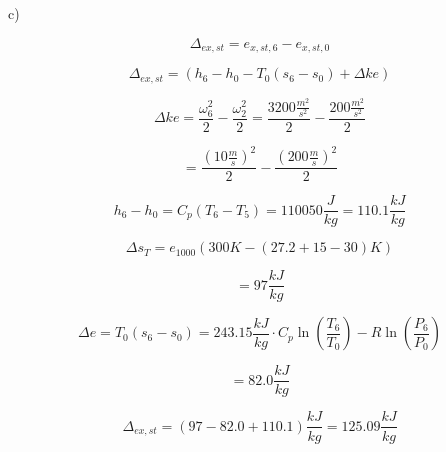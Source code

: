 c) 

\[
\Delta_{ex,st} = e_{x,st,6} - e_{x,st,0}
\]

\[
\Delta_{ex,st} = (h_6 - h_0 - T_0 (s_6 - s_0) + \Delta ke)
\]

\[
\Delta ke = \frac{\omega_6^2}{2} - \frac{\omega_2^2}{2} = \frac{3200 \frac{m^2}{s^2}}{2} - \frac{200 \frac{m^2}{s^2}}{2}
\]

\[
= \frac{(10 \frac{m}{s})^2}{2} - \frac{(200 \frac{m}{s})^2}{2}
\]

\[
h_6 - h_0 = C_p (T_6 - T_5) = 110050 \frac{J}{kg} = 110.1 \frac{kJ}{kg}
\]

\[
\Delta s_T = e_{1000} (300K - (27.2 + 15 - 30)K)
\]

\[
= 97 \frac{kJ}{kg}
\]

\[
\Delta e = T_0 (s_6 - s_0) = 243.15 \frac{kJ}{kg} \cdot C_p \ln \left( \frac{T_6}{T_0} \right) - R \ln \left( \frac{P_6}{P_0} \right)
\]

\[
= 82.0 \frac{kJ}{kg}
\]

\[
\Delta_{ex,st} = (97 - 82.0 + 110.1) \frac{kJ}{kg} = 125.09 \frac{kJ}{kg}
\]